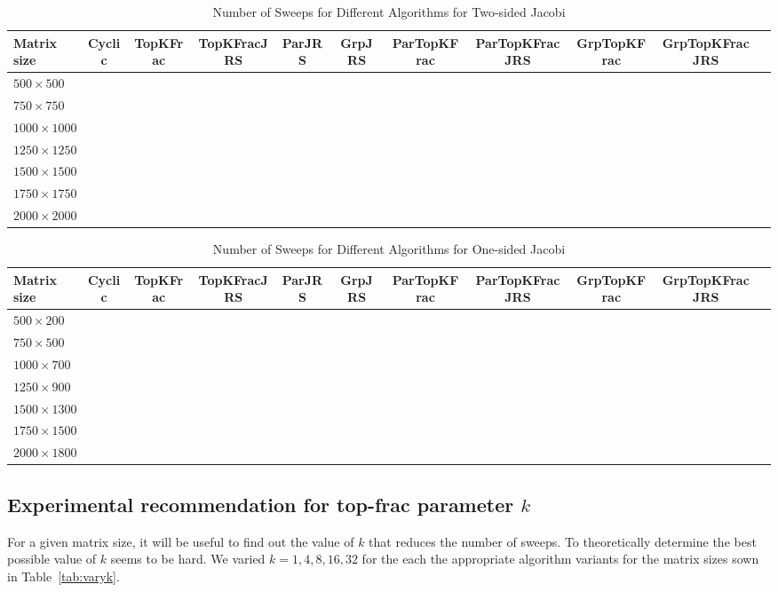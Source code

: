 \documentclass[10pt, conference, compsocconf]{IEEEtran}
\begin{document}
\begin{table}
  \centering
  \caption{Number of Sweeps for Different Algorithms for Two-sided Jacobi}
  \label{tab:twosided}
  \begin{tabular}{lcccccccccc}
    \toprule
    Matrix size & Cyclic & TopKFrac & TopKFracJRS & ParJRS & GrpJRS & ParTopKFrac & ParTopKFracJRS & GrpTopKFrac & GrpTopKFracJRS \\
    \midrule
    $500 \times 500$   &  \\
    $750 \times 750$   &  \\
    $1000 \times 1000$ &  \\
    $1250 \times 1250$ &  \\
    $1500 \times 1500$ &  \\
    $1750 \times 1750$ &  \\
    $2000 \times 2000$ &  \\
    \bottomrule
  \end{tabular}
\end{table}


\begin{table}
  \centering
  \caption{Number of Sweeps for Different Algorithms for One-sided Jacobi}
  \label{tab:onesided}
  \begin{tabular}{lcccccccccc}
    \toprule
    Matrix size & Cyclic & TopKFrac & TopKFracJRS & ParJRS & GrpJRS & ParTopKFrac & ParTopKFracJRS & GrpTopKFrac & GrpTopKFracJRS \\
    \midrule
    $500 \times 200$   &  \\
    $750 \times 500$   &  \\
    $1000 \times 700$  &  \\
    $1250 \times 900$  &  \\
    $1500 \times 1300$ &  \\
    $1750 \times 1500$ &  \\
    $2000 \times 1800$ &  \\
    \bottomrule
  \end{tabular}
\end{table}

\subsection{Experimental recommendation for top-frac parameter $k$}

For a given matrix size, it will be useful to find out the value of $k$ that reduces the number of sweeps. To theoretically determine the best possible value of $k$ seems to be hard. We varied $k=1,4,8,16,32$ for the each the appropriate algorithm variants for the matrix sizes sown in Table~\ref{tab:varyk}.
\end{document}
